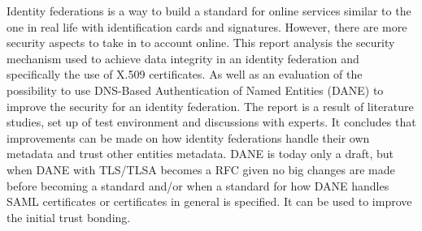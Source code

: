 Identity federations is a way to build a standard for online services similar to the one in real life with identification cards and signatures.
However, there are more security aspects to take in to account online.
This report analysis the security mechanism used to achieve data integrity in an identity federation and specifically the use of X.509 certificates.
As well as an evaluation of the possibility to use DNS-Based Authentication of Named Entities (DANE) to improve the security for an identity federation.
The report is a result of literature studies, set up of test environment and discussions with experts.
It concludes that improvements can be made on how identity federations handle their own metadata and trust other entities metadata. 
DANE is today only a draft, but when DANE with TLS/TLSA becomes a RFC given no big changes are made before becoming a standard and/or when a standard for how DANE handles SAML certificates or certificates in general is specified.
It can be used to improve the initial trust bonding.





